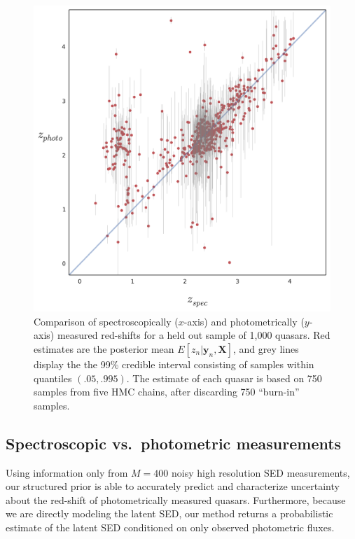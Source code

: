 \documentclass{article}
\begin{document}
\begin{figure}[h]
\vskip 0.2in
\begin{center}
\centerline{\includegraphics[width=\columnwidth]{../figs/red-shift-test-predictions}}
\vskip -0.2in
\caption{Comparison of spectroscopically ($x$-axis) and photometrically ($y$-axis) measured red-shifts for a held out sample of 1,000 quasars.  Red estimates are the posterior mean $E[z_n | \mathbf{y}_n, \mathbf{X}]$, and grey lines display the the 99\% credible interval consisting of samples within quantiles $(.05, .995)$.  The estimate of each quasar is based on 750 samples from five HMC chains, after discarding 750 ``burn-in'' samples. }
\label{fig:vs}
\end{center}
\end{figure}


\subsection{Spectroscopic vs.~photometric measurements}

Using information only from $M = 400$ noisy high resolution SED measurements, our structured prior is able to accurately predict and characterize uncertainty about the red-shift of photometrically measured quasars.  Furthermore, because we are directly modeling the latent SED, our method returns a probabilistic estimate of the latent SED conditioned on only observed photometric fluxes.  
\end{document}
